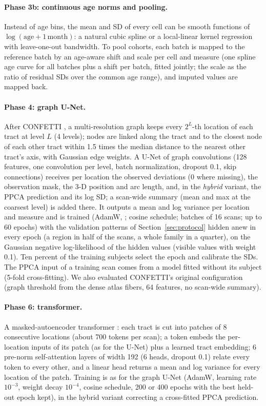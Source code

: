\documentclass[11pt]{article}
\begin{document}
\paragraph{Phase 3b: continuous age norms and pooling.} Instead of age bins, the mean and SD of every cell can be smooth
functions of $\log(\text{age}+1\,\text{month})$: a natural cubic spline or a local-linear kernel regression with
leave-one-out bandwidth. To pool cohorts, each batch is mapped to the reference batch by an age-aware shift and scale
per cell and measure (one spline age curve for all batches plus a shift per batch, fitted jointly; the scale as the
ratio of residual SDs over the common age range), and imputed values are mapped back.

\paragraph{Phase 4: graph U-Net.} After CONFETTI \citep{confetti}, a multi-resolution graph keeps every $2^L$-th
location of each tract at level $L$ (4 levels); nodes are linked along the tract and to the closest node of each
other tract within 1.5 times the median distance to the nearest other tract's axis, with Gaussian edge weights. A
U-Net \citep{gao2019graphunet} of graph convolutions \citep{kipf2017gcn} (128 features, one convolution per level,
batch normalization, dropout 0.1, skip connections) receives per location the observed deviations (0 where missing),
the observation mask, the 3-D position and arc length, and, in the \emph{hybrid} variant, the PPCA prediction and its
log SD; a scan-wide summary (mean and max at the coarsest level) is added there. It outputs a mean and log variance per
location and measure and is trained (AdamW, \citealp{loshchilov2019adamw}; cosine schedule; batches of 16 scans; up to
60 epochs) with the validation patterns of Section~\ref{sec:protocol} hidden anew in every epoch (a region in half of
the scans, a whole family in a quarter), on the Gaussian negative log-likelihood of the hidden values
\citep{kendall2017uncertainties} (visible values with weight 0.1). Ten percent of the training subjects select the
epoch and calibrate the SDs. The PPCA input of a training scan comes from a model fitted without its subject (5-fold
cross-fitting). We also evaluated CONFETTI's original configuration (graph threshold from the dense atlas fibers, 64
features, no scan-wide summary).

\paragraph{Phase 6: transformer.} A masked-autoencoder transformer \citep{vaswani2017attention,he2022mae}: each tract
is cut into patches of 8 consecutive locations (about 700 tokens per scan); a token embeds the per-location inputs of
its patch (as for the U-Net) plus a learned tract embedding; 6 pre-norm self-attention layers of width 192 (6 heads,
dropout 0.1) relate every token to every other, and a linear head returns a mean and log variance for every location of
the patch. Training is as for the graph U-Net (AdamW, learning rate $10^{-3}$, weight decay $10^{-4}$, cosine schedule,
200 or 400 epochs with the best held-out epoch kept), in the hybrid variant correcting a cross-fitted PPCA prediction.
\end{document}

